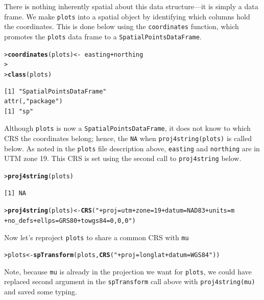 \documentclass[12pt,oneside]{book}\usepackage[]{graphicx}\usepackage[]{color}
\makeatletter
\newcommand{\hlstr}[1]{\textcolor[rgb]{0.192,0.494,0.8}{#1}}%
\newcommand{\hlopt}[1]{\textcolor[rgb]{0,0,0}{#1}}%
\newcommand{\hlstd}[1]{\textcolor[rgb]{0.345,0.345,0.345}{#1}}%
\newcommand{\hlkwb}[1]{\textcolor[rgb]{0.69,0.353,0.396}{#1}}%
\newcommand{\hlkwd}[1]{\textcolor[rgb]{0.737,0.353,0.396}{\textbf{#1}}}%
\newenvironment{kframe}{%
 \def\at@end@of@kframe{}%
 \ifinner\ifhmode%
  \def\at@end@of@kframe{\end{minipage}}%
  \begin{minipage}{\columnwidth}%
 \fi\fi%
 \def\FrameCommand##1{\hskip\@totalleftmargin \hskip-\fboxsep
 \colorbox{shadecolor}{##1}\hskip-\fboxsep
     \hskip-\linewidth \hskip-\@totalleftmargin \hskip\columnwidth}%
 \MakeFramed {\advance\hsize-\width
   \@totalleftmargin\z@ \linewidth\hsize
   \@setminipage}}%
 {\par\unskip\endMakeFramed%
 \at@end@of@kframe}
\newenvironment{knitrout}{}{} %
\makeatother
\begin{document}
There is nothing inherently spatial about this data structure---it is simply a data frame. We make \verb+plots+ into a spatial object by identifying which columns hold the coordinates. This is done below using the \verb+coordinates+ function, which promotes the \verb+plots+ data frame to a \verb+SpatialPointsDataFrame+. 
\begin{knitrout}
\color{fgcolor}\begin{kframe}
\begin{alltt}
\hlstd{> }\hlkwd{coordinates}\hlstd{(plots)} \hlkwb{<-} \hlopt{~}\hlstd{easting} \hlopt{+} \hlstd{northing}
\hlstd{> }
\hlstd{> }\hlkwd{class}\hlstd{(plots)}
\end{alltt}
\begin{verbatim}
[1] "SpatialPointsDataFrame"
attr(,"package")
[1] "sp"
\end{verbatim}
\end{kframe}
\end{knitrout}

Although \verb+plots+ is now a \verb+SpatialPointsDataFrame+, it does not know to which CRS the coordinates belong; hence, the \verb+NA+ when \verb+proj4string(plots)+ is called below. As noted in the \verb+plots+ file description above, \verb+easting+ and \verb+northing+ are in UTM zone 19. This CRS is set using the second call to \verb+proj4string+ below.

\begin{knitrout}
\color{fgcolor}\begin{kframe}
\begin{alltt}
\hlstd{> }\hlkwd{proj4string}\hlstd{(plots)}
\end{alltt}
\begin{verbatim}
[1] NA
\end{verbatim}
\begin{alltt}
\hlstd{> }\hlkwd{proj4string}\hlstd{(plots)} \hlkwb{<-} \hlkwd{CRS}\hlstd{(}\hlstr{"+proj=utm +zone=19 +datum=NAD83 +units=m 
                             +no_defs +ellps=GRS80 +towgs84=0,0,0"}\hlstd{)}
\end{alltt}
\end{kframe}
\end{knitrout}

Now let's reproject \verb+plots+ to share a common CRS with \verb+mu+
\begin{knitrout}
\color{fgcolor}\begin{kframe}
\begin{alltt}
\hlstd{> }\hlstd{plots} \hlkwb{<-} \hlkwd{spTransform}\hlstd{(plots,} \hlkwd{CRS}\hlstd{(}\hlstr{"+proj=longlat +datum=WGS84"}\hlstd{))}
\end{alltt}
\end{kframe}
\end{knitrout}
Note, because \verb+mu+ is already in the projection we want for \verb+plots+, we could have replaced second argument in the \verb+spTransform+ call above with \verb+proj4string(mu)+ and saved some typing.
\end{document}
